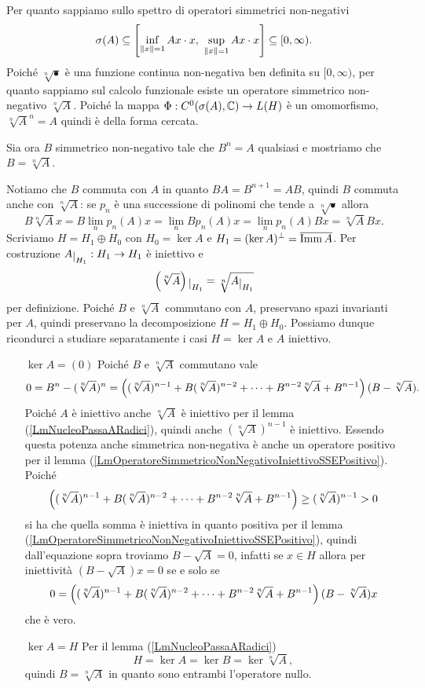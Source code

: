 \documentclass[a4paper]{article}
\begin{document}
\begin{solution}
Per quanto sappiamo sullo spettro di operatori simmetrici non-negativi 
\[\sigma(A)\subseteq \left[{\inf_{\left\Vert{x}\right\Vert=1}Ax\cdot x,\ \sup_{\left\Vert{x}\right\Vert=1}Ax\cdot x}\right]\subseteq [0,\infty).\] 
Poich\'e $\sqrt[n]\bullet$ \`e una funzione continua non-negativa ben definita su $[0,\infty)$, per quanto sappiamo sul calcolo funzionale esiste un operatore simmetrico non-negativo $\sqrt[n]A$. Poich\'e la mappa $\Phi:C^0(\sigma(A),\mathbb{C})\to L(H)$ \`e un omomorfismo, $\sqrt[n]A^n=A$ quindi \`e della forma cercata.
\medskip

Sia ora $B$ simmetrico non-negativo tale che $B^n=A$ qualsiasi e mostriamo che $B=\sqrt[n]A$.

\noindent
Notiamo che $B$ commuta con $A$ in quanto $BA=B^{n+1}=AB$, quindi $B$ commuta anche con $\sqrt[n]A$: se $p_n$ \`e una successione di polinomi che tende a $\sqrt[n]\bullet$ allora
\[B\sqrt[n]Ax=B\lim_np_n(A)x=\lim_{n}Bp_n(A)x=\lim_{n}p_n(A)Bx=\sqrt[n]ABx.\]
Scriviamo $H=H_1\oplus H_0$ con $H_0=\ker A$ e $H_1=(\ker A)^\perp=\overline{\operatorname{Imm} A}$. Per costruzione $A\res{H_1}:H_1\to H_1$ \`e iniettivo e 
\[\pa{\sqrt[n]A}\res{H_1}=\sqrt[n]{A\res{H_1}}\]
per definizione. Poich\'e $B$ e $\sqrt[n]A$ commutano con $A$, preservano spazi invarianti per $A$, quindi preservano la decomposizione $H=H_1\oplus H_0$. Possiamo dunque ricondurci a studiare separatamente i casi $H=\ker A$ e $A$ iniettivo.
\begin{itemize}
\item[$\boxed{\ker A=(0)}$] Poich\'e $B$ e $\sqrt[n]A$ commutano vale
\[0=B^n-(\sqrt[n]A)^n=\left({(\sqrt[n]A)^{n-1}+B(\sqrt[n]A)^{n-2}+\cdots+B^{n-2}\sqrt[n]A+B^{n-1}}\right)(B-\sqrt[n]A).\]
Poich\'e $A$ \`e iniettivo anche $\sqrt[n]A$ \`e iniettivo per il lemma (\ref{LmNucleoPassaARadici}), quindi anche $(\sqrt[n]A)^{n-1}$ \`e iniettivo. Essendo questa potenza anche simmetrica non-negativa \`e anche un operatore positivo per il lemma (\ref{LmOperatoreSimmetricoNonNegativoIniettivoSSEPositivo}).
Poich\'e
\[\left({(\sqrt[n]A)^{n-1}+B(\sqrt[n]A)^{n-2}+\cdots+B^{n-2}\sqrt[n]A+B^{n-1}}\right)\geq (\sqrt[n]A)^{n-1}>0\]
si ha che quella somma \`e iniettiva in quanto positiva per il lemma (\ref{LmOperatoreSimmetricoNonNegativoIniettivoSSEPositivo}), quindi dall'equazione sopra troviamo $B-\sqrt A=0$, infatti se $x\in H$ allora per iniettivit\`a $(B-\sqrt A)x=0$ se e solo se 
\[0=\left({(\sqrt[n]A)^{n-1}+B(\sqrt[n]A)^{n-2}+\cdots+B^{n-2}\sqrt[n]A+B^{n-1}}\right)(B-\sqrt[n]A)x\]
che \`e vero.
\item[$\boxed{\ker A=H}$] Per il lemma (\ref{LmNucleoPassaARadici})
\[H=\ker A=\ker B=\ker \sqrt[n]A,\]
quindi $B=\sqrt[n]A$ in quanto sono entrambi l'operatore nullo.
\end{itemize}
\end{solution}
\end{document}
